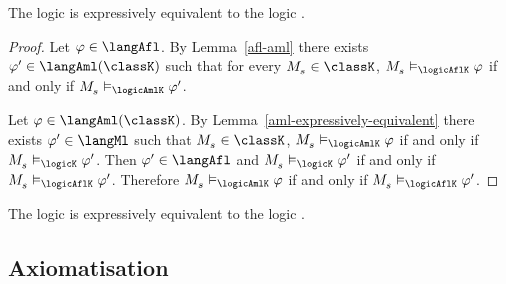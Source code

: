 \begin{proposition}
The logic \logicAflK{} is expressively equivalent to the logic \logicAmlK{}. 
\end{proposition}

\begin{proof}
Let $\phi \in \langAfl$.
By Lemma~\ref{afl-aml} there exists $\phi' \in \langAml(\classK)$ such that for every $\kPModel{\kStateS} \in \classK$, $\kPModel{\kStateS} \entails_\logicAflK \phi$ if and only if $\kPModel{\kStateS} \entails_\logicAmlK \phi'$.

Let $\phi \in \langAml(\classK)$.
By Lemma~\ref{aml-expressively-equivalent} there exists $\phi' \in \langMl$ such that $\kPModel{\kStateS} \in \classK$, $\kPModel{\kStateS} \entails_\logicAmlK \phi$ if and only if $\kPModel{\kStateS} \entails_\logicK \phi'$.
Then $\phi' \in \langAfl$ and $\kPModel{\kStateS} \entails_\logicK \phi'$ if and only if $\kPModel{\kStateS} \entails_\logicAflK \phi'$.
Therefore $\kPModel{\kStateS} \entails_\logicAmlK \phi$ if and only if $\kPModel{\kStateS} \entails_\logicAflK \phi'$.
\end{proof}

\begin{corollary}
The logic \logicAflK{} is expressively equivalent to the logic \logicK{}.
\end{corollary}

\subsection{Axiomatisation}

